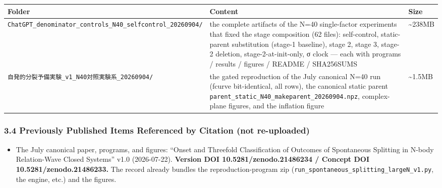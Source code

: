 \documentclass[
  a4paper,
]{ltjsarticle}
\newcounter{none} %
\providecommand{\tightlist}{%
  \setlength{\itemsep}{0pt}\setlength{\parskip}{0pt}}
\begin{document}
{\def\LTcaptype{none} %
\begin{longtable}[]{@{}
  >{\raggedright\arraybackslash}p{}
  >{\raggedright\arraybackslash}p{}
  >{\raggedright\arraybackslash}p{}@{}}
\toprule\noalign{}
\begin{minipage}[b]{\linewidth}\raggedright
Folder
\end{minipage} & \begin{minipage}[b]{\linewidth}\raggedright
Content
\end{minipage} & \begin{minipage}[b]{\linewidth}\raggedright
Size
\end{minipage} \\
\midrule\noalign{}
\endhead
\bottomrule\noalign{}
\endlastfoot
\texttt{ChatGPT\_denominator\_controls\_N40\_selfcontrol\_20260904/} &
the complete artifacts of the N=40 single-factor experiments that fixed
the stage composition (62 files): self-control, static-parent
substitution (stage-1 baseline), stage 2, stage 3, stage-2 deletion,
stage-2-at-init-only, σ clock --- each with programs / results / figures
/ README / SHA256SUMS & \textasciitilde238MB \\
\texttt{自発的分裂予備実験\_v1\_N40対照実験系\_20260904/} & the gated
reproduction of the July canonical N=40 run (fcurve bit-identical, all
rows), the canonical static parent
\texttt{parent\_static\_N40\_makeparent\_20260904.npz}, complex-plane
figures, and the inflation figure & \textasciitilde1.5MB \\
\end{longtable}
}

\subsubsection{3.4 Previously Published Items Referenced by Citation
(not
re-uploaded)}\label{previously-published-items-referenced-by-citation-not-re-uploaded}

\begin{itemize}
\tightlist
\item
  The July canonical paper, programs, and figures: ``Onset and Threefold
  Classification of Outcomes of Spontaneous Splitting in N-body
  Relation-Wave Closed Systems'' v1.0 (2026-07-22). \textbf{Version DOI
  10.5281/zenodo.21486234 / Concept DOI 10.5281/zenodo.21486233.} The
  record already bundles the reproduction-program zip
  (\texttt{run\_spontaneous\_splitting\_largeN\_v1.py}, the engine,
  etc.) and the figures.
\end{itemize}
\end{document}
